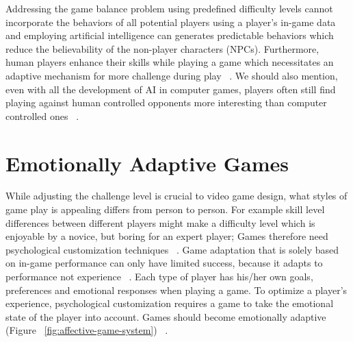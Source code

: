 Addressing the game balance problem using predefined difficulty levels cannot incorporate the behaviors of all potential players using a player's in-game data and employing artificial intelligence can generates predictable behaviors which reduce the believability of the non-player characters (NPCs). Furthermore, human players enhance their skills while playing a game which necessitates an adaptive mechanism for more challenge during play ~\cite{olesen2008real}. We should also mention, even with all the development of AI in computer games, players often still find playing against human controlled opponents more interesting than computer controlled ones ~\cite{weibel2008playing}.

\section{Emotionally Adaptive Games}
While adjusting the challenge level is crucial to video game design, what styles of game play is appealing differs from person to person. For example skill level differences between different players might make a difficulty level which is enjoyable by a novice, but boring for an expert player; Games therefore need psychological customization techniques ~\cite{saari2005towards}. Game adaptation that is solely based on in-game performance can only have limited success, because it adapts to performance not experience ~\cite{bartle1996hearts}. Each type of player has his/her own goals, preferences and emotional responses when playing a game. To optimize a player's experience, psychological customization requires a game to take the emotional state of the player into account. Games should become emotionally adaptive (Figure ~\ref{fig:affective-game-system}) ~\cite{tijs2009creating}.

